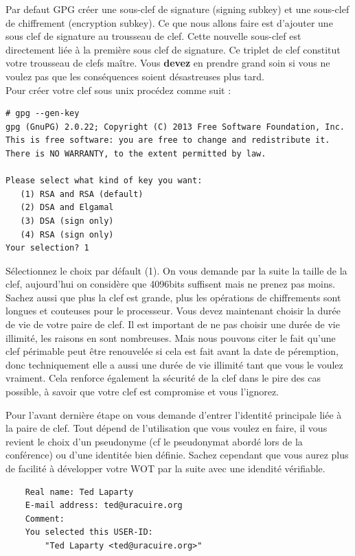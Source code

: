 \documentclass[a4paper]{article}
\begin{document}
Par defaut \textsc{GPG} créer une sous-clef de signature (signing subkey) et
une sous-clef de chiffrement (encryption subkey). Ce que nous allons faire est
d'ajouter une sous clef de signature au trousseau de clef. Cette nouvelle
sous-clef est directement liée à la première sous clef de signature. Ce triplet
de clef constitut votre trousseau de clefs maître. Vous \textbf{devez} en prendre grand
soin si vous ne voulez pas que les conséquences soient désastreuses plus tard.
\\
Pour créer votre clef sous unix procédez comme suit :
\begin{verbatim}
# gpg --gen-key
gpg (GnuPG) 2.0.22; Copyright (C) 2013 Free Software Foundation, Inc.
This is free software: you are free to change and redistribute it.
There is NO WARRANTY, to the extent permitted by law.

Please select what kind of key you want:
   (1) RSA and RSA (default)
   (2) DSA and Elgamal
   (3) DSA (sign only)
   (4) RSA (sign only)
Your selection? 1
\end{verbatim}

Sélectionnez le choix par défault (1). On vous demande par la suite la taille
de la clef, aujourd'hui on considère que 4096bits suffisent mais ne prenez pas
moins. Sachez aussi que plus la clef est grande, plus les opérations de
chiffrements sont longues et couteuses pour le processeur.
\newpage
Vous devez maintenant choisir la durée de vie de votre paire de clef. Il est
important de ne pas choisir une durée de vie illimité, les raisons en sont
nombreuses. Mais nous pouvons citer le fait qu'une clef périmable peut être
renouvelée si cela est fait avant la date de péremption, donc techniquement elle
a aussi une durée de vie illimité tant que vous le voulez vraiment.
Cela renforce également la sécurité de la clef dans le pire des cas possible,
à savoir que votre clef est compromise et vous l'ignorez.

Pour l'avant dernière étape on vous demande d'entrer l'identité principale liée
à la paire de clef. Tout dépend de l'utilisation que vous voulez en faire, il
vous revient le choix d'un pseudonyme (cf le pseudonymat abordé lors de la
conférence) ou d'une identitée bien définie. Sachez cependant que vous aurez
plus de facilité à développer votre \textsc{WOT} par la suite avec une idendité
vérifiable.

\begin{verbatim}
    Real name: Ted Laparty
    E-mail address: ted@uracuire.org
    Comment:
    You selected this USER-ID:
        "Ted Laparty <ted@uracuire.org>"
\end{verbatim}
\end{document}
